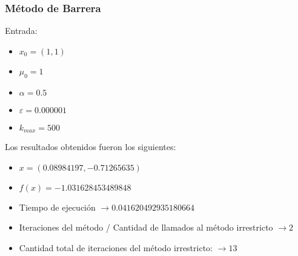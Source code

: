 \documentclass[titlepage, 11pt]{scrartcl}
\begin{document}
	\subsubsection{Método de Barrera}
	Entrada:
	\begin{itemize}
		\item $x_0 = (1, 1)$
		\item $\mu_0 = 1$
		\item $\alpha = 0.5$
		\item $\varepsilon = 0.000001$
		\item $k_{max} = 500$
	\end{itemize}
	Los resultados obtenidos fueron los siguientes:
	\begin{itemize}
		\item $x = ( 0.08984197, -0.71265635)$
		\item $f(x) = -1.031628453489848$
		\item Tiempo de ejecución $\rightarrow  0.041620492935180664$
		\item Iteraciones del método / Cantidad de llamados al método irrestricto $\rightarrow 2$
		\item Cantidad total de iteraciones del método irrestricto: $\rightarrow 13$
	\end{itemize}
	
\end{document}
